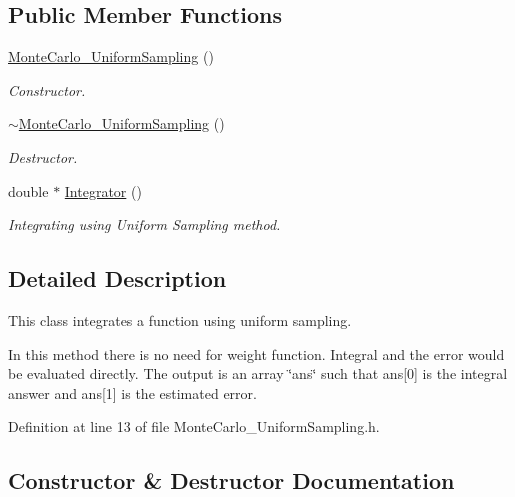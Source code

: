 \subsection*{Public Member Functions}
\begin{DoxyCompactItemize}
\item 
\hyperlink{class_monte_carlo___uniform_sampling_a1bf0ba8eb4f67d693a21e2d40601ee17}{Monte\+Carlo\+\_\+\+Uniform\+Sampling} ()
\begin{DoxyCompactList}\small\item\em Constructor. \end{DoxyCompactList}\item 
\hyperlink{class_monte_carlo___uniform_sampling_a1ccdb02604ffeb1f334b55ec24584f0c}{$\sim$\+Monte\+Carlo\+\_\+\+Uniform\+Sampling} ()
\begin{DoxyCompactList}\small\item\em Destructor. \end{DoxyCompactList}\item 
double $\ast$ \hyperlink{class_monte_carlo___uniform_sampling_a1920387a9f817c8179531fa02f7c00d3}{Integrator} ()
\begin{DoxyCompactList}\small\item\em Integrating using Uniform Sampling method. \end{DoxyCompactList}\end{DoxyCompactItemize}


\subsection{Detailed Description}
This class integrates a function using uniform sampling. 

In this method there is no need for weight function. Integral and the error would be evaluated directly. The output is an array \char`\"{}ans\char`\"{} such that ans\mbox{[}0\mbox{]} is the integral answer and ans\mbox{[}1\mbox{]} is the estimated error. 

Definition at line 13 of file Monte\+Carlo\+\_\+\+Uniform\+Sampling.\+h.



\subsection{Constructor \& Destructor Documentation}
\mbox{\label{class_monte_carlo___uniform_sampling_a1bf0ba8eb4f67d693a21e2d40601ee17}} 
